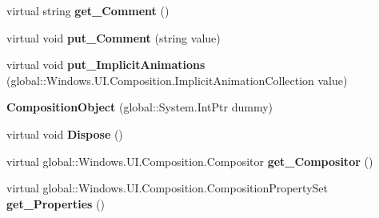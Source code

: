 \begin{DoxyCompactItemize}
\mbox{\label{class_windows_1_1_u_i_1_1_composition_1_1_composition_object_ae75723b4139b9231f070eeeff95eb764}} 
virtual string {\bfseries get\+\_\+\+Comment} ()
\item 
\mbox{\label{class_windows_1_1_u_i_1_1_composition_1_1_composition_object_a489899a008945284e6ce17e08c880cb7}} 
virtual void {\bfseries put\+\_\+\+Comment} (string value)
\item 
\mbox{\label{class_windows_1_1_u_i_1_1_composition_1_1_composition_object_ad8d4008a5c31ce42878ce448fe3e5598}} 
virtual void {\bfseries put\+\_\+\+Implicit\+Animations} (global\+::\+Windows.\+U\+I.\+Composition.\+Implicit\+Animation\+Collection value)
\item 
\mbox{\label{class_windows_1_1_u_i_1_1_composition_1_1_composition_object_a31b74b02386afece7eb73f6d8009fdea}} 
{\bfseries Composition\+Object} (global\+::\+System.\+Int\+Ptr dummy)
\item 
\mbox{\label{class_windows_1_1_u_i_1_1_composition_1_1_composition_object_a443e6ebcc8d54382c90b7a6309ef1b1f}} 
virtual void {\bfseries Dispose} ()
\item 
\mbox{\label{class_windows_1_1_u_i_1_1_composition_1_1_composition_object_a02238179cbd70c9e4a518009d12e39e7}} 
virtual global\+::\+Windows.\+U\+I.\+Composition.\+Compositor {\bfseries get\+\_\+\+Compositor} ()
\item 
\mbox{\label{class_windows_1_1_u_i_1_1_composition_1_1_composition_object_a365892d3180752a586915b7673ffda82}} 
virtual global\+::\+Windows.\+U\+I.\+Composition.\+Composition\+Property\+Set {\bfseries get\+\_\+\+Properties} ()
\item 
\mbox{\label{class_windows_1_1_u_i_1_1_composition_1_1_composition_object_af5a951dd44f067e4376daa62bcd893a1}} 

\end{DoxyCompactItemize}
